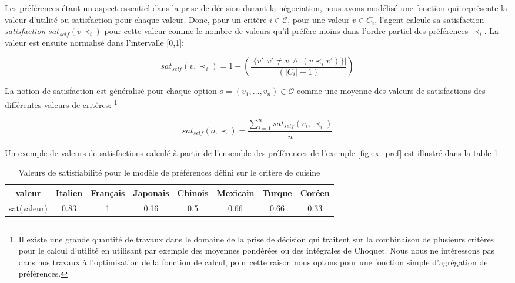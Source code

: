 		
			
			Les préférences étant un aspect essentiel dans la prise de décision durant la négociation, nous avons modélisé une fonction qui représente la valeur d'utilité ou satisfaction pour chaque valeur. Donc, pour un critère $i\in \mathcal{C}$, pour une valeur $v\in C_i$, l'agent calcule sa satisfaction \emph{satisfaction} $sat_{self}(v \prec_i)$ pour cette valeur comme le nombre de valeurs qu'il préfère moins dans l'ordre partiel des préférences $\prec_i$. La valeur est ensuite normalisé dans l'intervalle [0,1]:
			
			\begin{equation}
			sat_{self}(v, \prec_i) =	1 - \left( \frac{|\{v' : v' \neq v \  \wedge \ (v \prec_i v')\}| }{( |C_i| - 1 )}\right)
			\end{equation}
			
			La notion de satisfaction est généralisé pour chaque option $o= (v_1, \ldots, v_n)\in \mathcal{O}$ comme une moyenne des valeurs de satisfactions des différentes valeurs de critères: 
			\footnote{Il existe une grande quantité de travaux  dans le domaine de la prise de décision  qui traitent sur la combinaison de plusieurs critères pour le calcul d'utilité en utilisant par exemple des moyennes pondérées ou des intégrales de Choquet. Nous nous ne intéressons pas dans nos travaux à l'optimisation de la fonction de calcul, pour cette raison nous optons pour une fonction simple d'agrégation de préférences.}
	
			\begin{equation}
			sat_{self}(o, \prec) = \frac{\sum_{i=1}^{n} sat_{self}(v_i, \prec_i) }{n}
			\end{equation}
		
			Un exemple de valeurs de satisfactions calculé à partir de l'ensemble des préférences de l'exemple \ref{fig:ex_pref} est illustré dans la table \ref{tab:sat}
					\begin{table}[h]
						\centering
								{\scriptsize
						\begin{tabular}{ |c|c|c|c|c|c|c|c| }
							\hline				
							valeur & Italien & Français & Japonais & Chinois & Mexicain & Turque & Coréen \\
							\hline
							
							sat(valeur) & 0.83 & 1 & 0.16 & 0.5 & 0.66 & 0.66 & 0.33 \\
							\hline
							
						\end{tabular}}
						\caption{Valeurs de satisfiabilité pour le modèle de préférences défini sur le critère de cuisine}
						\label{tab:sat}
					\end{table}
	
